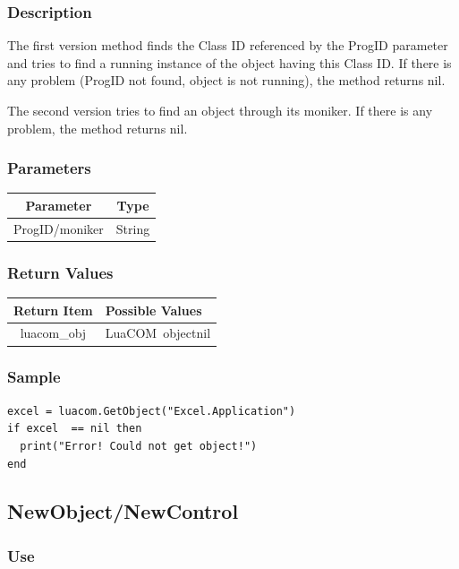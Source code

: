 \documentclass[11pt,a4paper,english]{report}
\newcommand{\techname}[1]{\mbox{#1}}
\newcommand{\luacom}{\techname{LuaCOM}}
\begin{document}
\subsubsection*{Description}
The first version method finds the Class ID referenced by the ProgID parameter
and tries to find a running instance of the object having this Class
ID. If there is any problem (ProgID not found, object is not running),
the method returns nil.

The second version tries to find an object through its moniker. If there is
any problem, the method returns nil.

\subsubsection*{Parameters}

\begin{tabular}{|c|c|}
\hline
\bf Parameter & \bf Type  \\ \hline \hline
ProgID/moniker & String \\ \hline
\end{tabular}

\subsubsection*{Return Values}

\begin{tabular}{|c|p{4cm}|}
\hline
\bf Return Item & \bf Possible Values \\ \hline \hline
luacom\_obj  & \luacom\ object\newline nil \\ \hline
\end{tabular}

\subsubsection*{Sample}

\begin{verbatim}
excel = luacom.GetObject("Excel.Application")
if excel  == nil then
  print("Error! Could not get object!")
end
\end{verbatim}

\subsection*{NewObject/NewControl}

\subsubsection*{Use}
\end{document}
